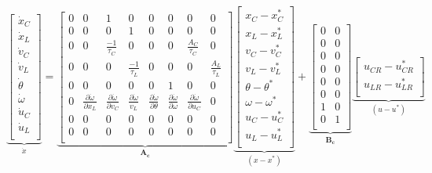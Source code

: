 \documentclass[12pt]{article}
\begin{document}
\begin{equation}
\underbrace{
\begin{bmatrix}
\dot{x}_C \\
\dot{x}_L \\
\dot{v}_C \\
\dot{v}_L \\
\dot{\theta} \\
\dot{\omega} \\
\dot{u}_C \\
\dot{u}_L \\
\end{bmatrix}
}_{\dot{x}}
= 
\underbrace{
\begin{bmatrix}
0   &    0   &    1   &    0   &    0   &    0   &    0   &    0 \\
0   &    0   &    0   &    1   &    0   &    0   &    0   &    0 \\
0   &    0   &\frac{-1}{\tau_C}&    0    &   0    &   0 &  \frac{A_C}{\tau_C} &  0 \\
0   &    0   &    0  &  \frac{-1}{\tau_L} &  0   &    0   &    0  &  \frac{A_L}{\tau_L} \\
0   &    0   &    0  &     0   &    0   &    1   &    0   &    0 \\
0   &  \frac{\partial{\dot{\omega}}}{\partial{x_L}}& \frac{\partial{\dot{\omega}}}{\partial{v_C}}&   \frac{\partial{\dot{\omega}}}{{v_L}} & \frac{\partial{\dot{\omega}}}{\partial{\theta}} & \frac{\partial{\dot{\omega}}}{\partial{\omega}} & \frac{\partial{\dot{\omega}}}{\partial{u_C}} &   0 \\
0   &    0   &    0  &     0   &    0   &    0   &    0   &    0 \\
0   &    0   &    0   &    0   &    0   &    0    &   0   &    0 \\
\end{bmatrix}
}_\mathbf{A_c}
\underbrace{
\begin{bmatrix}
x_C - x_C^* \\
x_L - x_L^* \\
v_C - v_C^* \\
v_L - v_L^* \\
\theta - \theta^*\\
\omega - \omega^*\\
u_C - u_C^*\\
u_L - u_L^*\\
\end{bmatrix}
}_{(x-x^*)}
+
\underbrace{
\begin{bmatrix}
0 & 0 \\
0 & 0 \\
0 & 0 \\
0 & 0 \\
0 & 0 \\
0 & 0 \\
1 & 0 \\
0 & 1 \\
\end{bmatrix}
}_\mathbf{B_c}
\underbrace{
\begin{bmatrix}
u_{CR} - u_{CR}^* \\
u_{LR} - u_{LR}^* \\
\end{bmatrix}
}_{(u-u^*)}
\label{eq:LCM}
\end{equation}
\end{document}
